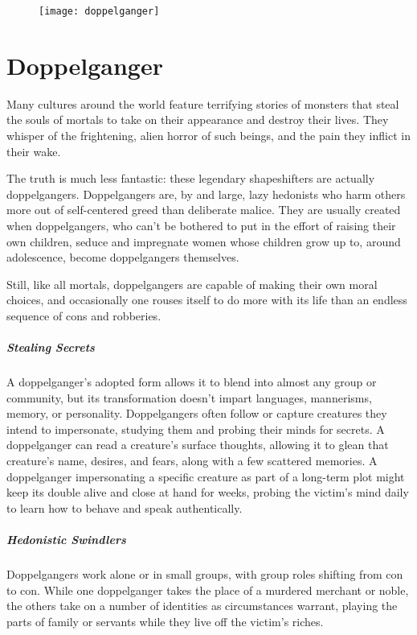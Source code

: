 \newpage

\begin{figure}[h]
	\texttt{[image: doppelganger]}
\end{figure}
{\vspace{-3em}}

\section{Doppelganger}
\par{Many cultures around the world feature terrifying stories of monsters that steal the souls of mortals to take on their appearance and destroy their lives. They whisper of the frightening, alien horror of such beings, and the pain they inflict in their wake.}
\par{The truth is much less fantastic: these legendary shapeshifters are actually doppelgangers. Doppelgangers are, by and large, lazy hedonists who harm others more out of self-centered greed than deliberate malice. They are usually created when doppelgangers, who can’t be bothered to put in the effort of raising their own children, seduce and impregnate women whose children grow up to, around adolescence, become doppelgangers themselves.}
\par{Still, like all mortals, doppelgangers are capable of making their own moral choices, and occasionally one rouses itself to do more with its life than an endless sequence of cons and robberies. \cite{d-hb}}

\subparagraph{Stealing Secrets}
{A doppelganger’s adopted form allows it to blend into almost any group or community, but its transformation doesn’t impart languages, mannerisms, memory, or personality. Doppelgangers often follow or capture creatures they intend to impersonate, studying them and probing their minds for secrets. A doppelganger can read a creature’s surface thoughts, allowing it to glean that creature’s name, desires, and fears, along with a few scattered memories. A doppelganger impersonating a specific creature as part of a long-term plot might keep its double alive and close at hand for weeks, probing the victim’s mind daily to learn how to behave and speak authentically. \cite{d-sre}}

\subparagraph{Hedonistic Swindlers}
{Doppelgangers work alone or in small groups, with group roles shifting from con to con. While one doppelganger takes the place of a murdered merchant or noble, the others take on a number of identities as circumstances warrant, playing the parts of family or servants while they live off the victim’s riches. \cite{d-sre}}

